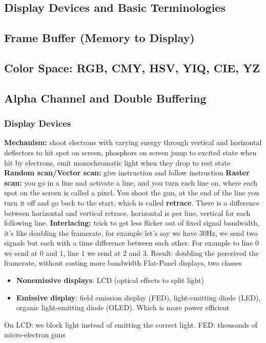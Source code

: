 \documentclass[11pt]{article}
\begin{document}
\subsection{Display Devices and Basic Terminologies}
\subsection{Frame Buffer (Memory to Display)}
\subsection{Color Space: RGB, CMY, HSV, YIQ, CIE, YZ}
\subsection{Alpha Channel and Double Buffering}

\subsubsection{Display Devices}
\textbf{Mechanism:}  shoot electrons with varying energy through vertical and horizontal deflectors to hit spot on screen, phosphors on screen jump to excited state when hit by electrons, emit monochromatic light when they drop to rest state
\newline
\textbf{Random scan/Vector scan:}  give instruction and follow instruction
\newline
\textbf{Raster scan:}  you go in a line and activate a line, and you turn each line on, where each spot on the screen is called a pixel. You shoot the gun, at the end of the line you turn it off and go back to the start, which is called \textbf{retrace}. There is a difference between horizontal and vertical retrace, horizontal is per line, vertical for each following line.
\newline
\textbf{Interlacing:} trick to get less flicker out of fixed signal bandwidth, it's like doubling the framerate, for example let's say we have 30Hz, we send two signals but each with a time difference between each other. For example to line 0 we send at 0 and 1, line 1 we send at 2 and 3. 
Result: doubling the perceived the framerate, without costing more bandwidth
\newline
Flat-Panel displays, two classes
\begin{itemize}
    \item \textbf{Nonemissive displays}: LCD (optical effects to split light)
    \item \textbf{Emissive display}: field emission display (FED), light-emitting diode (LED), organic light-emitting diode (OLED). Which is more power efficient
\end{itemize}
\noindent
On LCD: we block light instead of emitting the correct light.
\newline
FED: thousands of micro-electron guns
\end{document}
